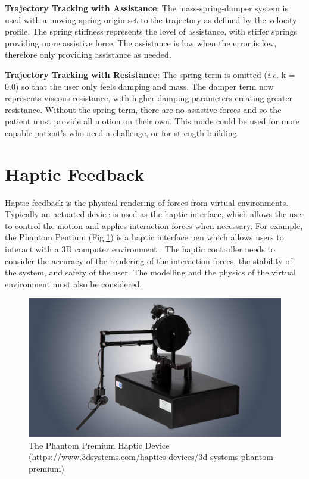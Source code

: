 \documentclass[12pt]{report}
\begin{document}
	\textbf{Trajectory Tracking with Assistance}: The mass-spring-damper system is used with a moving spring origin set to the trajectory as defined by the velocity profile. The spring stiffness represents the level of assistance, with stiffer springs providing more assistive force. The assistance is low when the error is low, therefore only providing assistance as needed. 
	
	\textbf{Trajectory Tracking with Resistance}: The spring term is omitted (\textit{i.e.} k = 0.0) so that the user only feels damping and mass. The damper term now represents viscous resistance, with higher damping parameters creating greater resistance. Without the spring term, there are no assistive forces and so the patient must provide all motion on their own. This mode could be used for more capable patient's who need a challenge, or for strength building. 
	
	

	\section{Haptic Feedback} \label{sec:haptic}
	
	
	Haptic feedback is the physical rendering of forces from virtual environments. Typically an actuated device is used as the haptic interface, which allows the user to control the motion and applies interaction forces when necessary. For example, the Phantom Pentium (Fig.\ref{fig:phantom}) is a haptic interface pen which allows users to interact with a 3D computer environment \cite{Massie1994}. The haptic controller needs to consider the accuracy of the rendering of the interaction forces, the stability of the system, and safety of the user. The modelling and the physics of the virtual environment must also be considered. 		
		
	
	\begin{figure}[t] 
		\centering
		\includegraphics[width=0.6\linewidth]{phantom}
		\caption{The Phantom Premium Haptic Device (https://www.3dsystems.com/haptics-devices/3d-systems-phantom-premium)}
		\label{fig:phantom}
	\end{figure}		
	
\end{document}
